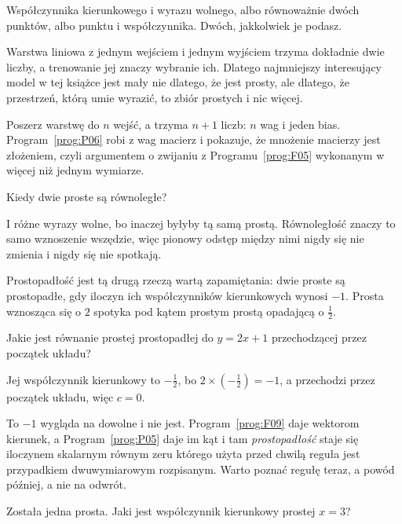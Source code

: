 \begin{fr}
Współczynnika kierunkowego i wyrazu wolnego, albo równoważnie dwóch punktów,
albo punktu i współczynnika. Dwóch, jakkolwiek je podasz.

\begin{aibox}
Warstwa liniowa z jednym wejściem i jednym wyjściem trzyma dokładnie dwie
liczby, a trenowanie jej znaczy wybranie ich. Dlatego najmniejszy interesujący
model w tej książce jest mały nie dlatego, że jest prosty, ale dlatego, że
przestrzeń, którą umie wyrazić, to zbiór prostych i nic więcej.

Poszerz warstwę do $n$ wejść, a trzyma $n + 1$ liczb: $n$ wag i jeden bias.
Program~\ref{prog:P06} robi z wag macierz i pokazuje, że mnożenie macierzy
jest złożeniem, czyli argumentem o zwijaniu z Programu~\ref{prog:F05}
wykonanym w więcej niż jednym wymiarze.
\end{aibox}

Kiedy dwie proste są równoległe?
\nextframe
\end{fr}

\begin{fr}
I różne wyrazy wolne, bo inaczej byłyby tą samą prostą. Równoległość znaczy to
samo wznoszenie wszędzie, więc pionowy odstęp między nimi nigdy się nie
zmienia i nigdy się nie spotkają.

Prostopadłość jest tą drugą rzeczą wartą zapamiętania: dwie proste są
prostopadłe, gdy iloczyn ich współczynników kierunkowych wynosi $-1$. Prosta
wznosząca się o $2$ spotyka pod kątem prostym prostą opadającą o
$\frac{1}{2}$.

Jakie jest równanie prostej prostopadłej do $y = 2x + 1$ przechodzącej przez
początek układu?
\nextframe
\end{fr}

\begin{fr}
Jej współczynnik kierunkowy to $-\frac{1}{2}$, bo
$2 \times \left(-\frac{1}{2}\right) = -1$, a przechodzi przez początek układu,
więc $c = 0$.

To $-1$ wygląda na dowolne i nie jest. Program~\ref{prog:F09} daje wektorom
kierunek, a Program~\ref{prog:P05} daje im kąt i tam \emph{prostopadłość}
staje się iloczynem skalarnym równym zeru \dash{} którego użyta przed chwilą
reguła jest przypadkiem dwuwymiarowym rozpisanym. Warto poznać regułę teraz, a
powód później, a nie na odwrót.

Została jedna prosta. Jaki jest współczynnik kierunkowy prostej $x = 3$?
\nextframe
\end{fr}


